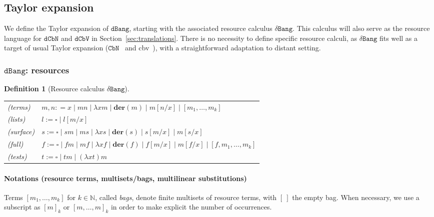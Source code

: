 \documentclass[10pt,a4paper]{article}
\newtheorem{definition}[theorem]{Definition}
\newcommand{\<}{\langle}
\renewcommand{\>}{\rangle}
\newcommand{\der}[1]{\ensuremath{\mathbf{der}(#1)}}
\newcommand{\dcbn}{\ensuremath{\mathtt{dCbN}}}
\newcommand{\cbn}{\ensuremath{\mathtt{CbN}}}
\newcommand{\dcbv}{\ensuremath{\mathtt{dCbV}}}
\newcommand{\dbang}{\ensuremath{\mathtt{dBang}}}
\newcommand{\dbangres}{\ensuremath{\mathtt{\delta Bang}}}
\newcommand{\es}[2]{[#1/#2]}
\begin{document}

\subsection{Taylor expansion}
\label{subsec:taylor-dbang}


We define the Taylor expansion of \dbang{}, starting with the associated resource calculus \dbangres.
This calculus will also serve as the resource language for \dcbn{} and \dcbv{} in
Section~\ref{sec:translations}.	There is no necessity to define specific resource calculi, as
$\dbangres$ fits well as a target 
of usual Taylor expansion (\cbn{}~\cite{ER08} and
cbv{}~\cite{ehrhard:Collapsing}), with a straightforward
adaptation to distant setting.

\subsubsection{\dbang{}: resources}
\label{subsubsec:dbang-ressources}

\begin{definition}[Resource calculus \dbangres]~
	\label{def:dbang-taylor-terms-and-ctxs}

	\begin{tabular}{ll}
	(terms) & $m,n: = x\mid mn\mid \lambda xm \mid  \der m \mid m\es nx\mid
	[m_1,\dots ,m_k]$ \\

	(lists) & $l:= \square \mid l[m/x]$ \\

	(surface) & $s:= \square \mid sm \mid ms \mid \lambda x s \mid
	\der s \mid s[m/x] \mid	m\es sx$\\
	
	(full) & $f:= \square \mid fm \mid mf \mid \lambda x f \mid
	\der f \mid f[m/x] \mid	m\es fx\mid [f,m_1,\dots ,m_k]$\\

	(tests)& $t:= \square \mid tm \mid (\lambda x t)m$
	\end{tabular}
\end{definition}

\paragraph*{Notations (resource terms, multisets/bags, multilinear substitutions)}
Terms $[m_1,\dots ,m_k]$ for $k\in\mathbb N$, called \emph{bags}, denote finite
multisets of resource terms, with $[~]$ the empty bag. When necessary, we use a subscript as $[m]_k$ or
$[m,\dots ,m]_k$ in order to make explicit the number of occurrences.
\end{document}
